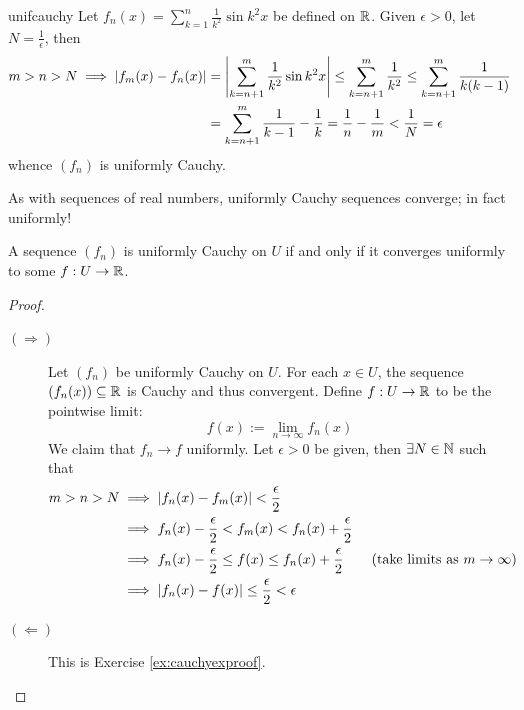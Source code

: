 \begin{example}{}{unifcauchy}
	Let $f_n(x)=\sum\limits_{k=1}^n\frac 1{k^2}\sin k^2x$ be defined on $\mathbb{R}$. Given $\epsilon>0$, let $N=\frac 1\epsilon$, then\vspace{-10pt}
	\begin{align*}
		m>n>N\implies \left| f_m(x)-f_n(x)\right|
		&=\left| \sum_{k=n+1}^m\frac 1{k^2}\sin k^2x\right| 
		\le\sum_{k=n+1}^m\frac 1{k^2} \le\sum_{k=n+1}^m\frac 1{k(k-1)}\\
		&=\sum_{k=n+1}^m\frac 1{k-1}-\frac 1k 
		=\frac 1n-\frac 1m<\frac 1N=\epsilon
	\end{align*}
	whence $(f_n)$ is uniformly Cauchy.
\end{example}


\goodbreak


As with sequences of real numbers, uniformly Cauchy sequences converge; in fact uniformly!

\begin{thm}{}{}
	A sequence $(f_n)$ is uniformly Cauchy on $U$ if and only if it converges uniformly to some $f:U\to\mathbb{R}$.
\end{thm}

\begin{proof}
	\begin{description}
		\item[$(\Rightarrow)$] Let $(f_n)$ be uniformly Cauchy on $U$. For each $x\in U$, the sequence $(f_n(x))\subseteq\mathbb{R}$ is Cauchy and thus convergent. Define $f:U\to\mathbb{R}$ to be the pointwise limit:
		\[
			f(x):=\lim\limits_{n\to\infty}f_n(x)
		\]
		We claim that $f_n\to f$ uniformly. Let $\epsilon>0$ be given, then $\exists N\in\mathbb{N}$ such that
		\begin{align*}
			m>n>N&\implies \left| f_n(x)-f_m(x)\right|<\frac\epsilon 2\\
			&\implies f_n(x)-\frac\epsilon 2<f_m(x)<f_n(x)+\frac\epsilon 2\\
			&\implies f_n(x)-\frac\epsilon 2\le f(x)\le f_n(x)+\frac\epsilon 2 \tag{take limits as $m\to\infty$}\\
			&\implies \left| f_n(x)-f(x)\right|\le\frac\epsilon 2<\epsilon
		\end{align*}
		\item[$(\Leftarrow)$] This is Exercise \ref{ex:cauchyexproof}.\qedhere
	\end{description}
\end{proof}


